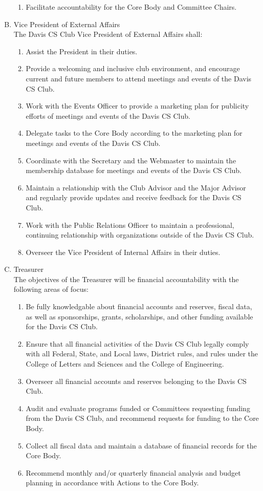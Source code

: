 \documentclass{article}
\newenvironment{li}{
\begin{enumerate}
  \setlength{\itemsep}{1pt}
  \setlength{\parskip}{0pt}
  \setlength{\parsep}{0pt}
}{\end{enumerate}}
\begin{document}
\begin{enumerate}[A.]
\begin{li}
	\item Facilitate accountability for the Core Body and Committee Chairs.
	\end{li}
\item Vice President of External Affairs\\
	The Davis CS Club Vice President of External Affairs shall:
	\begin{li}
	\item Assist the President in their duties.
	\item Provide a welcoming and inclusive club environment, and encourage current and future members to attend meetings and events of the Davis CS Club.
	\item Work with the Events Officer to provide a marketing plan for publicity efforts of meetings and events of the Davis CS Club.
	\item Delegate tasks to the Core Body according to the marketing plan for meetings and events of the Davis CS Club.
	\item Coordinate with the Secretary and the Webmaster to maintain the membership database for meetings and events of the Davis CS Club.
	\item Maintain a relationship with the Club Advisor and the Major Advisor and regularly provide updates and receive feedback for the Davis CS Club.
	\item Work with the Public Relations Officer to maintain a professional, continuing relationship with organizations outside of the Davis CS Club.
	\item Overseer the Vice President of Internal Affairs in their duties.
	\end{li}
\item Treasurer\\
	The objectives of the Treasurer will be financial accountability with the following areas of focus:
	\begin{li}
	\item Be fully knowledgable about financial accounts and reserves, fiscal data, as well as sponsorships, grants, scholarships, and other funding available for the Davis CS Club.
	\item Ensure that all financial activities of the Davis CS Club legally comply with all Federal, State, and Local laws, District rules, and rules under the College of Letters and Sciences and the College of Engineering.
	\item Overseer all financial accounts and reserves belonging to the Davis CS Club.
	\item Audit and evaluate programs funded or Committees requesting funding from the Davis CS Club, and recommend requests for funding to the Core Body.
	\item Collect all fiscal data and maintain a database of financial records for the Core Body.
	\item Recommend monthly and/or quarterly financial analysis and budget planning in accordance with Actions to the Core Body.
	\end{li}


\end{enumerate}
\end{document}
